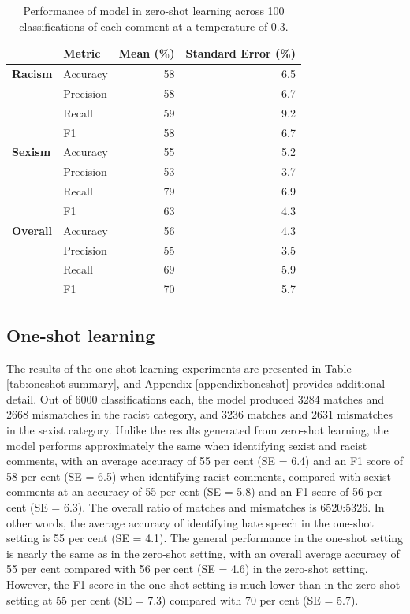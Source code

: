 \documentclass[12pt,]{article}
\begin{document}
\begin{table}

\caption{\label{tab:zeroshot-summary}Performance of model in zero-shot learning across 100 classifications of each comment at a temperature of 0.3.}
\centering
\begin{tabular}[t]{>{}llrr}
\toprule
 & Metric & Mean (\%) & Standard Error (\%)\\
\midrule
\textbf{Racism} & Accuracy & 58 & 6.5\\
\textbf{} & Precision & 58 & 6.7\\
\textbf{} & Recall & 59 & 9.2\\
\textbf{} & F1 & 58 & 6.7\\
\textbf{Sexism} & Accuracy & 55 & 5.2\\
\textbf{} & Precision & 53 & 3.7\\
\textbf{} & Recall & 79 & 6.9\\
\textbf{} & F1 & 63 & 4.3\\
\textbf{Overall} & Accuracy & 56 & 4.3\\
\textbf{} & Precision & 55 & 3.5\\
\textbf{} & Recall & 69 & 5.9\\
\textbf{} & F1 & 70 & 5.7\\
\bottomrule
\end{tabular}
\end{table}

\hypertarget{one-shot-learning-1}{%
\subsection{One-shot learning}\label{one-shot-learning-1}}

The results of the one-shot learning experiments are presented in Table \ref{tab:oneshot-summary}, and Appendix \ref{appendixboneshot} provides additional detail. Out of 6000 classifications each, the model produced 3284 matches and 2668 mismatches in the racist category, and 3236 matches and 2631 mismatches in the sexist category. Unlike the results generated from zero-shot learning, the model performs approximately the same when identifying sexist and racist comments, with an average accuracy of 55 per cent (SE = 6.4) and an F1 score of 58 per cent (SE = 6.5) when identifying racist comments, compared with sexist comments at an accuracy of 55 per cent (SE = 5.8) and an F1 score of 56 per cent (SE = 6.3). The overall ratio of matches and mismatches is 6520:5326. In other words, the average accuracy of identifying hate speech in the one-shot setting is 55 per cent (SE = 4.1). The general performance in the one-shot setting is nearly the same as in the zero-shot setting, with an overall average accuracy of 55 per cent compared with 56 per cent (SE = 4.6) in the zero-shot setting. However, the F1 score in the one-shot setting is much lower than in the zero-shot setting at 55 per cent (SE = 7.3) compared with 70 per cent (SE = 5.7).
\end{document}
